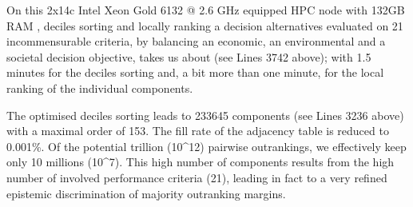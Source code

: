\documentclass[a4paper,12pt,english]{sphinxhowto}
\begin{document}
\begin{sphinxVerbatim}[commandchars=\\\{\},numbers=left,firstnumber=1,stepnumber=1]
           
           
           
           
           
           
           
\end{sphinxVerbatim}

On this 2x14c Intel Xeon Gold 6132 @ 2.6 GHz equipped HPC node with 132GB RAM \sphinxfootnotemark[7], deciles sorting and locally ranking a  decision alternatives evaluated on 21 incommensurable criteria, by balancing an economic, an environmental and a societal decision objective, takes us about  (see Lines 37\sphinxhyphen{}42 above); with 1.5 minutes for the deciles sorting and, a bit more than one minute, for the local ranking of the individual components.

The optimised deciles sorting leads to 233645 components (see Lines 32\sphinxhyphen{}36 above) with a maximal order of 153. The fill rate of the adjacency table is reduced to 0.001\%. Of the potential trillion (10\textasciicircum{}12) pairwise outrankings, we effectively keep only 10 millions (10\textasciicircum{}7). This high number of components results from the high number of involved performance criteria (21), leading in fact to a very refined epistemic discrimination of majority outranking margins.
\end{document}
